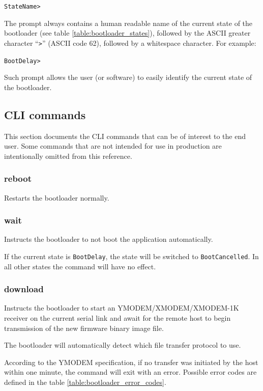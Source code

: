 \documentclass{zubaxdoc}
\begin{document}
\verb|StateName> |

The prompt always contains a human readable name of the current state of the bootloader
(see table \ref{table:bootloader_states}),
followed by the ASCII greater character ``\verb|>|'' (ASCII code 62), followed by a whitespace character.
For example:

\verb|BootDelay> |

Such prompt allows the user (or software) to easily identify the current state of the bootloader.

\subsection{CLI commands}

This section documents the CLI commands that can be of interest to the end user.
Some commands that are not intended for use in production are intentionally omitted from this reference.

\subsubsection{reboot}

Restarts the bootloader normally.

\subsubsection{wait}

Instructs the bootloader to not boot the application automatically.

If the current state is \verb|BootDelay|, the state will be switched to \verb|BootCancelled|.
In all other states the command will have no effect.

\subsubsection{download}

Instructs the bootloader to start an YMODEM/XMODEM/XMODEM-1K receiver on the current serial link
and await for the remote host to begin transmission of the new firmware binary image file.

The bootloader will automatically detect which file transfer protocol to use.

According to the YMODEM specification, if no transfer was initiated by the host within one minute,
the command will exit with an error.
Possible error codes are defined in the table \ref{table:bootloader_error_codes}.
\end{document}
